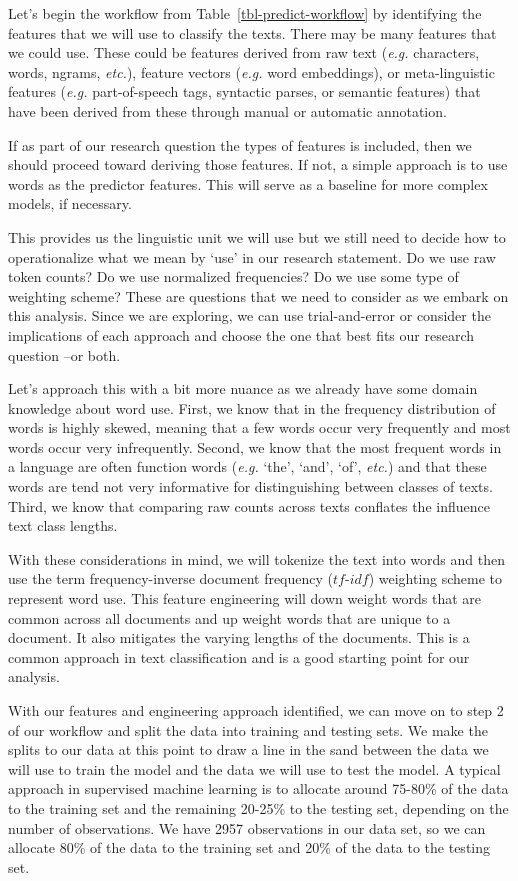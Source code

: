 \documentclass[
  letterpaper,
  krantz1]{latex/krantz-mod}
\theoremstyle{definition}
\theoremstyle{definition}
\theoremstyle{remark}
\begin{document}
Let's begin the workflow from Table~\ref{tbl-predict-workflow} by
identifying the features that we will use to classify the texts. There
may be many features that we could use. These could be features derived
from raw text (\emph{e.g.} characters, words, ngrams, \emph{etc.}),
feature vectors (\emph{e.g.} word embeddings), or meta-linguistic
features (\emph{e.g.} part-of-speech tags, syntactic parses, or semantic
features) that have been derived from these through manual or automatic
annotation.

If as part of our research question the types of features is included,
then we should proceed toward deriving those features. If not, a simple
approach is to use words as the predictor features. This will serve as a
baseline for more complex models, if necessary.

This provides us the linguistic unit we will use but we still need to
decide how to operationalize what we mean by `use' in our research
statement. Do we use raw token counts? Do we use normalized frequencies?
Do we use some type of weighting scheme? These are questions that we
need to consider as we embark on this analysis. Since we are exploring,
we can use trial-and-error or consider the implications of each approach
and choose the one that best fits our research question --or both.

Let's approach this with a bit more nuance as we already have some
domain knowledge about word use. First, we know that in the frequency
distribution of words is highly skewed, meaning that a few words occur
very frequently and most words occur very infrequently. Second, we know
that the most frequent words in a language are often function words
(\emph{e.g.} `the', `and', `of', \emph{etc.}) and that these words are
tend not very informative for distinguishing between classes of texts.
Third, we know that comparing raw counts across texts conflates the
influence text class lengths.

With these considerations in mind, we will tokenize the text into words
and then use the term frequency-inverse document frequency
(\(tf\)-\(idf\)) weighting scheme to represent word use. This feature
engineering will down weight words that are common across all documents
and up weight words that are unique to a document. It also mitigates the
varying lengths of the documents. This is a common approach in text
classification and is a good starting point for our analysis.

With our features and engineering approach identified, we can move on to
step 2 of our workflow and split the data into training and testing
sets. We make the splits to our data at this point to draw a line in the
sand between the data we will use to train the model and the data we
will use to test the model. A typical approach in supervised machine
learning is to allocate around 75-80\% of the data to the training set
and the remaining 20-25\% to the testing set, depending on the number of
observations. We have 2957 observations in our data set, so we can
allocate 80\% of the data to the training set and 20\% of the data to
the testing set.
\end{document}
